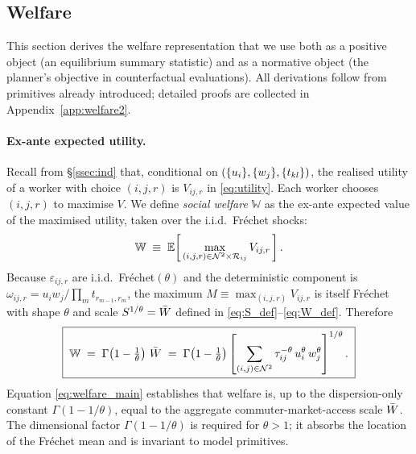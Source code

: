 \subsection{Welfare}\label{ssec:welfare}

This section derives the welfare representation that we use both as a
positive object (an equilibrium summary statistic) and as a normative
object (the planner's objective in counterfactual evaluations).  All
derivations follow from primitives already introduced; detailed
proofs are collected in Appendix~\ref{app:welfare2}.

\paragraph{Ex-ante expected utility.}
Recall from \S\ref{ssec:ind} that, conditional on
$(\{u_i\},\{w_j\},\{t_{kl}\})$, the realised utility of a worker with
choice $(i,j,r)$ is $V_{ij,r}$ in \eqref{eq:utility}.  Each worker
chooses $(i,j,r)$ to maximise $V$.  We define \emph{social welfare}
$\mathbb W$ as the ex-ante expected value of the maximised utility,
taken over the i.i.d.\ Fr\'echet shocks:
\begin{equation}
  \mathbb W
  \;\equiv\;
  \mathbb E\!\left[\,\max_{(i,j,r)\in\mathcal N^{2}\times\mathcal R_{ij}}V_{ij,r}\,\right].
  \label{eq:welfare_def}
\end{equation}
Because $\varepsilon_{ij,r}$ are i.i.d.\ Fr\'echet$(\theta)$ and the
deterministic component is $\omega_{ij,r}=u_iw_j/\prod_m
t_{r_{m-1},r_m}$, the maximum $M\equiv\max_{(i,j,r)}V_{ij,r}$ is
itself Fr\'echet with shape $\theta$ and scale $S^{1/\theta}=\bar W$
defined in \eqref{eq:S_def}--\eqref{eq:W_def}.  Therefore
\begin{equation}
  \boxed{\;\mathbb W
  \;=\;\Gamma\!\left(1-\tfrac{1}{\theta}\right)\,\bar W
  \;=\;\Gamma\!\left(1-\tfrac{1}{\theta}\right)
       \left[\sum_{(i,j)\in\mathcal N^{2}}
             \tau_{ij}^{-\theta}\,u_i^{\theta}\,w_j^{\theta}\right]^{1/\theta}.\;}
  \label{eq:welfare_main}
\end{equation}
Equation \eqref{eq:welfare_main} establishes that welfare is, up to the
dispersion-only constant $\Gamma(1-1/\theta)$, equal to the aggregate
commuter-market-access scale $\bar W$.  The dimensional factor
$\Gamma(1-1/\theta)$ is required for $\theta>1$; it absorbs the
location of the Fr\'echet mean and is invariant to model primitives.

